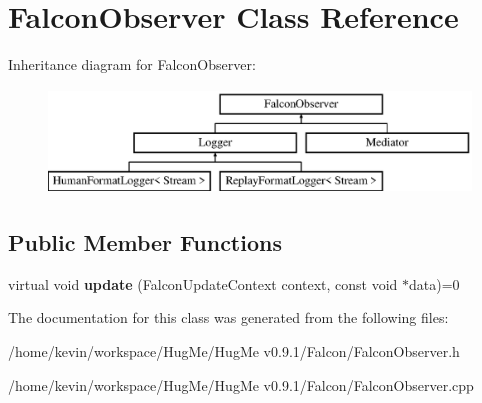 \hypertarget{classFalconObserver}{
\section{FalconObserver Class Reference}
\label{classFalconObserver}
}
Inheritance diagram for FalconObserver:\begin{figure}[H]
\begin{center}
\leavevmode
\includegraphics[height=2.78607cm]{classFalconObserver}
\end{center}
\end{figure}
\subsection*{Public Member Functions}
\begin{DoxyCompactItemize}
\item 
\hypertarget{classFalconObserver_a6a6dd6934aefdb9de8e94b089b21e1b9}{
virtual void {\bfseries update} (FalconUpdateContext context, const void $\ast$data)=0}
\label{classFalconObserver_a6a6dd6934aefdb9de8e94b089b21e1b9}

\end{DoxyCompactItemize}


The documentation for this class was generated from the following files:\begin{DoxyCompactItemize}
\item 
/home/kevin/workspace/HugMe/HugMe v0.9.1/Falcon/FalconObserver.h\item 
/home/kevin/workspace/HugMe/HugMe v0.9.1/Falcon/FalconObserver.cpp\end{DoxyCompactItemize}
